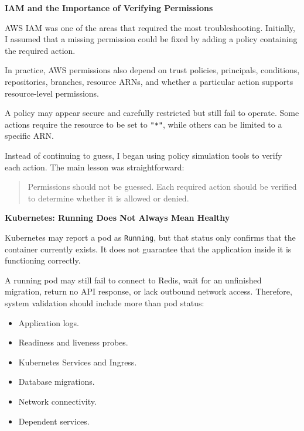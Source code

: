 \vspace{0.5em}\noindent\textbf{IAM and the Importance of Verifying
Permissions}\par

AWS IAM was one of the areas that required the most troubleshooting.
Initially, I assumed that a missing permission could be fixed by adding
a policy containing the required action.

In practice, AWS permissions also depend on trust policies, principals,
conditions, repositories, branches, resource ARNs, and whether a
particular action supports resource-level permissions.

A policy may appear secure and carefully restricted but still fail to
operate. Some actions require the resource to be set to \texttt{"*"},
while others can be limited to a specific ARN.

Instead of continuing to guess, I began using policy simulation tools to
verify each action. The main lesson was straightforward:

\begin{quote}
Permissions should not be guessed. Each required action should be
verified to determine whether it is allowed or denied.
\end{quote}

\vspace{0.5em}\noindent\textbf{Kubernetes: Running Does Not Always Mean
Healthy}\par

Kubernetes may report a pod as \texttt{Running}, but that status only
confirms that the container currently exists. It does not guarantee that
the application inside it is functioning correctly.

A running pod may still fail to connect to Redis, wait for an unfinished
migration, return no API response, or lack outbound network access.
Therefore, system validation should include more than pod status:

\begin{itemize}
\tightlist
\item
  Application logs.
\item
  Readiness and liveness probes.
\item
  Kubernetes Services and Ingress.
\item
  Database migrations.
\item
  Network connectivity.
\item
  Dependent services.
\end{itemize}

